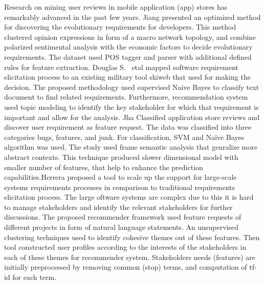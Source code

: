 Research on mining user reviews in mobile application (app) stores has
remarkably advanced in the past few years. Jiang \etal \cite{Jiang:2014}
presented an optimized method for discovering the evolutionary requirements for
developers. This method clustered opinion expressions in form of a macro network
topology, and combine polarized sentimental analysis with the economic factors
to decide evolutionary requirements. The dataset used POS tagger and parser with
additional defined rules for feature extraction. Douglas S. ~etal
\cite{Douglas:S2008} mapped software requirement elicitation process to an
existing military tool skiweb that used for making the decision. The proposed
methodology used supervised Naive Bayes to classify text document to find
related requirements. Furthermore, recommendation system used topic modeling to
identify the key stakeholder for which that requirement is important and allow
for the analysis. Jha \etal \cite{Jha:2017} Classified application store reviews
and discover user requirement as feature request. The data was classified into
three categories bugs, features, and junk. For classification, SVM and Naïve
Bayes algorithm was used. The study used frame semantic analysis that genralize
more abstract contexts. This technique produced slower dimensional model with
smaller number of features, that help to enhance the prediction
capabilities.Herrera\etal \cite{Castro-Herrera:2009} proposed a tool to scale up
the support for large-scale systems requirements processes in comparison to
traditional requirements elicitation process. The large oftware systems are
complex due to this it is hard to manage stakeholders and identify the relevant
stakeholders for further discussions.
The proposed recommender framework used feature requests of different projects
in form of natural language statements.
An unsupervised clustering techniques used to identify cohesive themes out of
these features. Then tool constructed user profiles according to the interests
of the stakeholders in each of these themes for recommender system. Stakeholders
needs (features) are initially preprocessed by removing common (stop) terms, and
computation of tf-id for each term. \\




